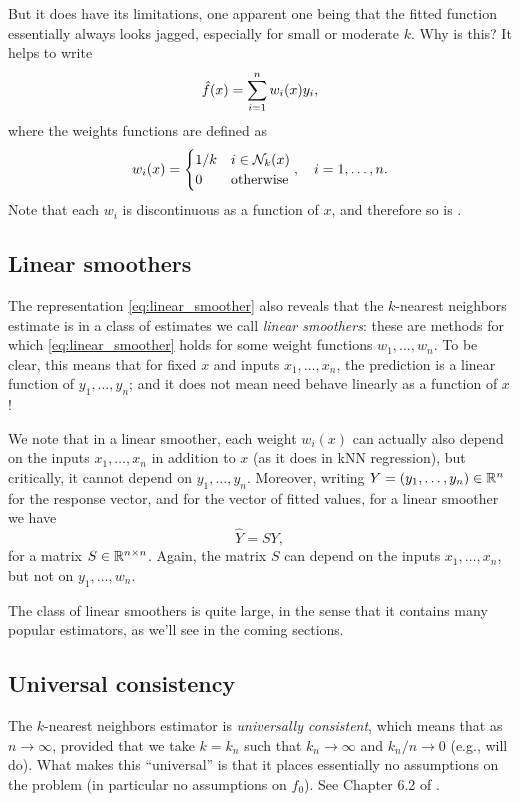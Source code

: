 \documentclass{article}
\begin{document}
But it does have its limitations, one apparent one being that the fitted
function \smash{$\hf$} essentially always looks jagged, especially for small or
moderate $k$.  Why is this?  It helps to write 
\begin{equation}
\label{eq:linear_smoother}
\hat{f}(x) = \sum_{i=1}^n w_i(x) y_i,
\end{equation}
where the weights functions are defined as
\[
w_i(x) = \begin{cases}
1/k & i \in \mathcal{N}_k(x) \\ 
0 & \text{otherwise}
\end{cases}, \quad i=1,\dots,n.
\]
Note that each $w_i$ is discontinuous as a function of $x$, and therefore so is 
\smash{$\hf$}.

\subsection{Linear smoothers}

The representation \eqref{eq:linear_smoother} also reveals that the $k$-nearest
neighbors estimate is in a class of estimates we call \emph{linear smoothers}:
these are methods for which \eqref{eq:linear_smoother} holds for some weight
functions $w_1,\dots,w_n$. To be clear, this means that for fixed $x$ and inputs
$x_1,\dots,x_n$, the prediction  is a linear function of
$y_1,\dots,y_n$; and it does not mean \smash{$\hf$} need behave linearly as a
function of $x$!  

We note that in a linear smoother, each weight $w_i(x)$ can actually also depend
on the inputs $x_1,\dots,x_n$ in addition to $x$ (as it does in kNN regression),
but critically, it cannot depend on $y_1,\dots,y_n$. Moreover, writing $Y =
(y_1,\dots,y_n) \in \mathbb{R}^n$ for the response vector, and  for the vector of fitted values, for a
linear smoother we have 
\[
\hat{Y} = S Y,
\]
for a matrix $S \in \mathbb{R}^{n \times n}$. Again, the matrix $S$ can depend on the
inputs $x_1,\dots,x_n$, but not on $y_1,\dots,w_n$. 

The class of linear
smoothers is quite large, in the sense that it contains many popular estimators,
as we'll see in the coming sections.  

\subsection{Universal consistency}

The $k$-nearest neighbors estimator is \emph{universally consistent}, which
means that  as $n \to \infty$, provided that we
take $k=k_n$ such that $k_n \to \infty$ and $k_n/n \to 0$ (e.g.,
 will do). What makes this ``universal'' is that it places
essentially no assumptions on the problem (in particular no assumptions on
$f_0$). See Chapter 6.2 of \citet{gyorfi2002distribution}. 
\end{document}
